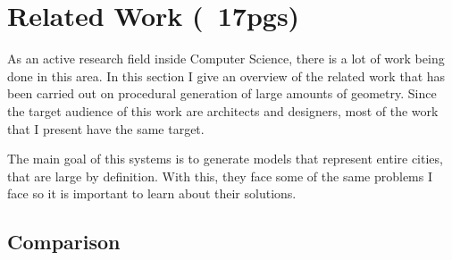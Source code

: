 
% 
% 

\section{Related Work (~17pgs)}
\label{sec:related_work}

As an active research field inside Computer Science, there is a lot of work being done in this area. In this section I give an overview of the related work that has been carried out on procedural generation of large amounts of geometry. Since the target audience of this work are architects and designers, most of the work that I present have the same target.

The main goal of this systems is to generate models that represent entire cities, that are large by definition. With this, they face some of the same problems I face so it is important to learn about their solutions.






\subsection{Comparison} %
\label{sub:comparison}




